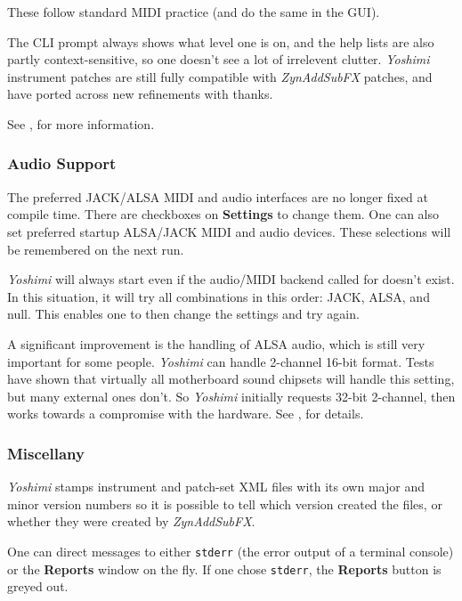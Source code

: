 \documentclass[
 11pt,
 twoside,
 a4paper,
 final                                 %
]{article}
\begin{document}
   These follow standard MIDI practice (and do the same in the GUI).
   
   The CLI prompt always
   shows what level one is on, and the help lists are also partly
   context-sensitive, so one doesn't see a lot of irrelevent clutter.
   \textsl{Yoshimi} instrument patches are still fully
   compatible with \textsl{ZynAddSubFX} patches, and have ported across
   new refinements with thanks.

   See , for more information.

\subsubsection{Audio Support}
\label{subsubsec:new_features_audio_support}

   The preferred JACK/ALSA MIDI and audio interfaces are no longer fixed at
   compile time. There are checkboxes on \textbf{Settings} to change them.
   One can also set preferred startup ALSA/JACK MIDI and audio devices.
   These selections will be remembered on the next run.

   \textsl{Yoshimi} will always start even if the audio/MIDI backend called
   for doesn't exist. In this situation, it will try all combinations in this
   order: JACK, ALSA, and null. This enables one to then change the settings
   and try again.

   A significant improvement is the handling of ALSA audio, which is still very
   important for some people.  \textsl{Yoshimi} can handle 2-channel 16-bit
   format. Tests have shown that virtually all motherboard sound chipsets will
   handle this setting, but many external ones don't.  So \textsl{Yoshimi}
   initially requests 32-bit 2-channel, then works towards a compromise with the
   hardware.
   See , for details.

\subsubsection{Miscellany}
\label{subsubsec:new_features_miscellany}

   \textsl{Yoshimi} stamps instrument and patch-set XML files with its own
   major and minor version numbers so it is possible to tell which version
   created the files, or whether they were created by \textsl{ZynAddSubFX}.

   One can direct messages to either \texttt{stderr}
   (the error output of a terminal console) or the \textbf{Reports} window
   on the fly. If one chose \texttt{stderr}, the \textbf{Reports} button is
   greyed out.
\end{document}
